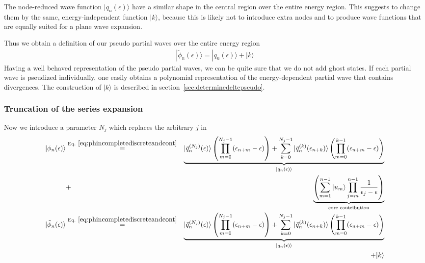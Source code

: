 \documentclass[11pt,a4paper]{report}
\begin{document}
The node-reduced wave function $|q_n(\epsilon)\rangle$ have a similar
shape in the central region over the entire energy region. This
suggests to change them by the same, energy-independent function
$|k\rangle$, because this is likely not to introduce extra nodes and
to produce wave functions that are equally suited for a plane wave
expansion.

Thus we obtain a definition of our pseudo partial waves over the
entire energy region
\begin{eqnarray}
|\tilde{\phi}_n(\epsilon)\rangle
=|q_n(\epsilon)\rangle+|k\rangle
\label{eq:defphitildenofe}
\end{eqnarray}
Having a well behaved representation of the pseudo partial waves, we
can be quite sure that we do not add ghost states. If each partial
wave is pseudized individually, one easily obtains a polynomial
representation of the energy-dependent partial wave that contains
divergences.  The construction of $|k\rangle$ is described in
section~\ref{sec:determinedeltepseudo}.

\subsubsection{Truncation of the series expansion}
Now we introduce a parameter $N_j$ which replaces the arbitrary $j$
in 
\begin{eqnarray}
|\phi_n(\epsilon)\rangle
&\eqrel{eq:phincompletediscreteandcont}{=}&
\underbrace{
|\bar{q}_n^{(N_j)}(\epsilon)\rangle
\left(\prod_{m=0}^{N_j-1}(\epsilon_{n+m}-\epsilon)\right)
+
\sum_{k=0}^{N_j-1}
|\bar{q}_{n}^{(k)}(\epsilon_{n+k})\rangle
\left(\prod_{m=0}^{k-1}(\epsilon_{n+m}-\epsilon)\right)
}_{|q_n(\epsilon)\rangle}
\nonumber\\
&+&
\underbrace{
\left(\sum_{m=1}^{n-1}|u_m\rangle\prod_{j=m}^{n-1}\frac{1}{\epsilon_j-\epsilon}\right)
}_{\text{core contribution}}
\label{eq:phinofeexact}
\\
|\tilde{\phi}_n(\epsilon)\rangle
&\eqrel{eq:phincompletediscreteandcont}{=}&
\underbrace{
|\bar{q}_n^{(N_j)}(\epsilon)\rangle
\left(\prod_{m=0}^{N_j-1}(\epsilon_{n+m}-\epsilon)\right)
+
\sum_{k=0}^{N_j-1}
|\bar{q}_{n}^{(k)}(\epsilon_{n+k})\rangle
\left(\prod_{m=0}^{k-1}(\epsilon_{n+m}-\epsilon)\right)
}_{|q_n(\epsilon)\rangle}
\nonumber\\
&&+|k\rangle
\label{eq:phitildenofeexact}
\end{eqnarray}
\end{document}
